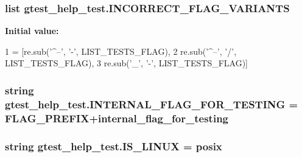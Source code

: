 \subsubsection[{\texorpdfstring{I\+N\+C\+O\+R\+R\+E\+C\+T\+\_\+\+F\+L\+A\+G\+\_\+\+V\+A\+R\+I\+A\+N\+TS}{INCORRECT_FLAG_VARIANTS}}]{\setlength{\rightskip}{0pt plus 5cm}list gtest\+\_\+help\+\_\+test.\+I\+N\+C\+O\+R\+R\+E\+C\+T\+\_\+\+F\+L\+A\+G\+\_\+\+V\+A\+R\+I\+A\+N\+TS}\hypertarget{namespacegtest__help__test_a6f677b9f975f09db7604a5ee9c4821a3}{}\label{namespacegtest__help__test_a6f677b9f975f09db7604a5ee9c4821a3}
{\bfseries Initial value\+:}
\begin{DoxyCode}
1 = [re.sub(\textcolor{stringliteral}{'^--'}, \textcolor{stringliteral}{'-'}, LIST\_TESTS\_FLAG),
2                            re.sub(\textcolor{stringliteral}{'^--'}, \textcolor{stringliteral}{'/'}, LIST\_TESTS\_FLAG),
3                            re.sub(\textcolor{stringliteral}{'\_'}, \textcolor{stringliteral}{'-'}, LIST\_TESTS\_FLAG)]
\end{DoxyCode}
\subsubsection[{\texorpdfstring{I\+N\+T\+E\+R\+N\+A\+L\+\_\+\+F\+L\+A\+G\+\_\+\+F\+O\+R\+\_\+\+T\+E\+S\+T\+I\+NG}{INTERNAL_FLAG_FOR_TESTING}}]{\setlength{\rightskip}{0pt plus 5cm}string gtest\+\_\+help\+\_\+test.\+I\+N\+T\+E\+R\+N\+A\+L\+\_\+\+F\+L\+A\+G\+\_\+\+F\+O\+R\+\_\+\+T\+E\+S\+T\+I\+NG = {\bf F\+L\+A\+G\+\_\+\+P\+R\+E\+F\+IX}+\textquotesingle{}internal\+\_\+flag\+\_\+for\+\_\+testing\textquotesingle{}}\hypertarget{namespacegtest__help__test_aa7f487cde98f691eecc5f1f5e67c0a69}{}\label{namespacegtest__help__test_aa7f487cde98f691eecc5f1f5e67c0a69}
\subsubsection[{\texorpdfstring{I\+S\+\_\+\+L\+I\+N\+UX}{IS_LINUX}}]{\setlength{\rightskip}{0pt plus 5cm}string gtest\+\_\+help\+\_\+test.\+I\+S\+\_\+\+L\+I\+N\+UX = \textquotesingle{}posix\textquotesingle{}}\hypertarget{namespacegtest__help__test_ae61a149d50be253176a139fbe6712582}{}\label{namespacegtest__help__test_ae61a149d50be253176a139fbe6712582}
